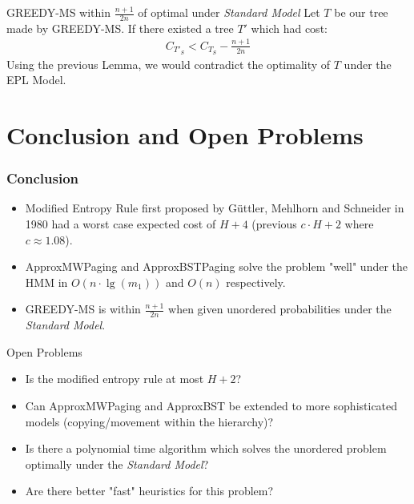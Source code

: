 \documentclass[]{beamer}
\theoremstyle{plain}
\begin{document}
\begin{frame}{GREEDY-MS within $\frac{n+1}{2n}$ of optimal under \textit{Standard Model}}
Let $T$ be our tree made by GREEDY-MS. If there existed a tree $T'$ which had cost:
\begin{align*}
C_{T'_S} < C_{T_S} - \frac{n+1}{2n}
\end{align*}
Using the previous Lemma, we would contradict the optimality of $T$ under the EPL Model.
\end{frame}





\section{Conclusion and Open Problems} \label{Conclusion and Open Problems}

\begin{frame} \frametitle{Conclusion}
\begin{itemize}
\item Modified Entropy Rule first proposed by  G{\"u}ttler, Mehlhorn and Schneider in 1980 had a worst case expected cost of $H+4$ (previous $c\cdot H+2$ where $c \approx 1.08$).

\item ApproxMWPaging and ApproxBSTPaging solve the problem "well" under the HMM in $O(n\cdot \lg(m_1))$ and $O(n)$ respectively.

\item GREEDY-MS is within $\frac{n+1}{2n}$ when given unordered probabilities under the \textit{Standard Model}.   
\end{itemize}

\end{frame}


\begin{frame}{Open Problems}
\begin{itemize}
\item Is the modified entropy rule at most $H+2$?
\item Can ApproxMWPaging and ApproxBST be extended to more sophisticated models (copying/movement within the hierarchy)?
\item Is there a polynomial time algorithm which solves the unordered problem optimally under the \textit{Standard Model}?
\item Are there better "fast" heuristics for this problem?
\end{itemize}
\end{frame}




\end{document}
